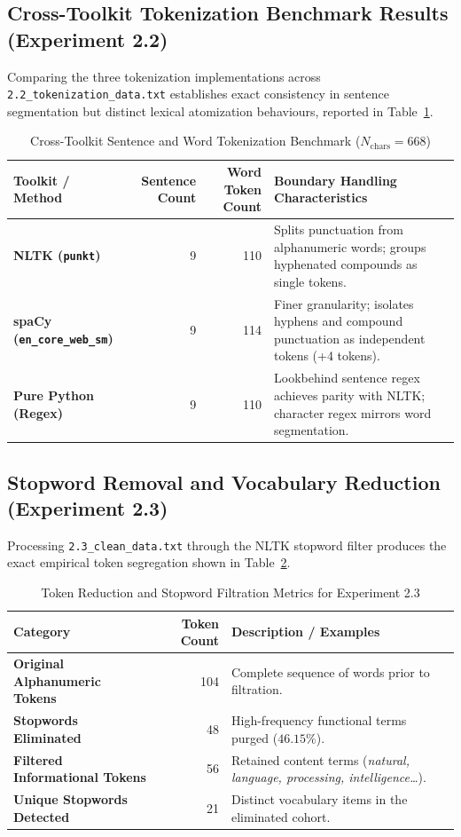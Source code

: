 \documentclass[12pt,a4paper]{report}
\begin{document}
\subsection{Cross-Toolkit Tokenization Benchmark Results (Experiment 2.2)}
Comparing the three tokenization implementations across \texttt{2.2\_tokenization\_data.txt} establishes exact consistency in sentence segmentation but distinct lexical atomization behaviours, reported in Table~\ref{tab:exp2_tok_comparison}.
\begin{table}[H]
\centering
\small
\caption{Cross-Toolkit Sentence and Word Tokenization Benchmark ($N_{\text{chars}} = 668$)}
\label{tab:exp2_tok_comparison}
\begin{tabular}{lrrp{7.5cm}}
\toprule
\textbf{Toolkit / Method} & \textbf{Sentence Count} & \textbf{Word Token Count} & \textbf{Boundary Handling Characteristics} \\
\midrule
\textbf{NLTK (\texttt{punkt})} & 9 & 110 & Splits punctuation from alphanumeric words; groups hyphenated compounds as single tokens. \\
\textbf{spaCy (\texttt{en\_core\_web\_sm})} & 9 & 114 & Finer granularity; isolates hyphens and compound punctuation as independent tokens (+4 tokens). \\
\textbf{Pure Python (Regex)} & 9 & 110 & Lookbehind sentence regex achieves parity with NLTK; character regex mirrors word segmentation. \\
\bottomrule
\end{tabular}
\end{table}

\subsection{Stopword Removal and Vocabulary Reduction (Experiment 2.3)}
Processing \texttt{2.3\_clean\_data.txt} through the NLTK stopword filter produces the exact empirical token segregation shown in Table~\ref{tab:exp2_stopword_summary}.
\begin{table}[H]
\centering
\small
\caption{Token Reduction and Stopword Filtration Metrics for Experiment 2.3}
\label{tab:exp2_stopword_summary}
\begin{tabular}{lrp{8cm}}
\toprule
\textbf{Category} & \textbf{Token Count} & \textbf{Description / Examples} \\
\midrule
\textbf{Original Alphanumeric Tokens} & 104 & Complete sequence of words prior to filtration. \\
\textbf{Stopwords Eliminated} & 48 & High-frequency functional terms purged ($46.15\%$). \\
\textbf{Filtered Informational Tokens} & 56 & Retained content terms (\textit{natural, language, processing, intelligence\dots}). \\
\textbf{Unique Stopwords Detected} & 21 & Distinct vocabulary items in the eliminated cohort. \\
\bottomrule
\end{tabular}
\end{table}
\end{document}
